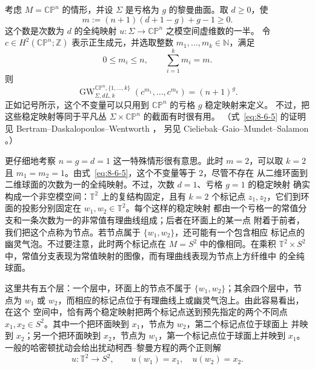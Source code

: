 \begin{example}\label{ex:8-6-12}
考虑 $M=\mathbb{CP}^n$ 的情形，并设 $\Sigma$ 是亏格为 $g$ 的黎曼曲面。取
$d\ge0$，使
\[
  m:=(n+1)(d+1-g)+g-1\ge0.
\]
这个数是次数为 $d$ 的全纯映射 $u:\Sigma\to\mathbb{CP}^n$ 之模空间虚维数的一半。
令 $c\in H^2(\mathbb{CP}^n;\mathbb Z)$ 表示正生成元，并选取整数
$m_1,\ldots,m_k\in\mathbb N$，满足
\[
  0\le m_i\le n,\qquad \sum_{i=1}^k m_i=m.
\]
则
\begin{equation}\label{eq:8-6-5}
  \operatorname{GW}^{\mathbb{CP}^n,\{1,\ldots,k\}}_{\Sigma,dL,k}
  (c^{m_1},\ldots,c^{m_k})=(n+1)^g.
\end{equation}
正如记号所示，这个不变量可以只用到 $\mathbb{CP}^n$ 的亏格 $g$ 稳定映射来定义。
不过，把这些稳定映射等同于平凡丛 $\Sigma\times\mathbb{CP}^n$ 的截面有时很有用。
（式~\eqref{eq:8-6-5} 的证明见 Bertram--Daskalopoulos--Wentworth ，
另见 Cieliebak--Gaio--Mundet--Salamon 。）

更仔细地考察 $n=g=d=1$ 这一特殊情形很有意思。此时 $m=2$，可以取
$k=2$ 且 $m_1=m_2=1$。由式~\eqref{eq:8-6-5}，这个不变量等于 $2$，尽管不存在
从二维环面到二维球面的次数为一的全纯映射。不过，次数 $d=1$、亏格 $g=1$ 的稳定映射
确实构成一个非空模空间：$\mathbb T^2$ 上的复结构固定，且有 $k=2$ 个标记点
$z_1,z_2$，它们到环面的投影分别固定在 $w_1,w_2\in\mathbb T^2$。每个这样的稳定映射
都由一个亏格一的常值分支和一条次数为一的非常值有理曲线组成；后者在环面上的某一点
附着于前者，我们把这个点称为节点。若节点属于 $\{w_1,w_2\}$，还可能有一个包含相应
标记点的幽灵气泡。不过要注意，此时两个标记点在 $M=S^2$ 中的像相同。在乘积
$\mathbb T^2\times S^2$ 中，常值分支表现为常值映射的图像，而有理曲线表现为节点上方纤维中
的全纯球面。

这里共有五个层：一个层中，环面上的节点不属于 $\{w_1,w_2\}$；其余四个层中，节点为
$w_1$ 或 $w_2$，而相应的标记点位于有理曲线上或幽灵气泡上。由此容易看出，在这个
空间中，恰有两个稳定映射把两个标记点送到预先指定的两个不同点
$x_1,x_2\in S^2$。其中一个把环面映到 $x_1$，节点为 $w_2$，第二个标记点位于球面上
并映到 $x_2$；另一个把环面映到 $x_2$，节点为 $w_1$，第一个标记点位于球面上并映到
$x_1$。一般的哈密顿扰动会给出扰动柯西--黎曼方程的两个正则解
\[
  u:\mathbb T^2\longrightarrow S^2,\qquad
  u(w_1)=x_1,\quad u(w_2)=x_2.
\]


\end{example}
